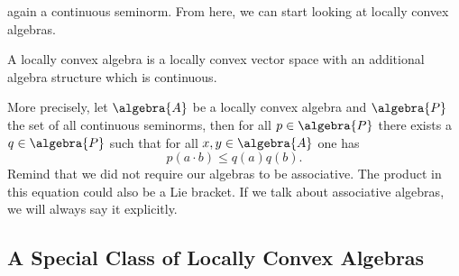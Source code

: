 again a continuous seminorm. From here, we can start looking at locally convex 
algebras.
\begin{definition}
	\label{Def:LCAlgebra}
	A locally convex algebra is a locally convex vector space with an 
	additional algebra structure which is continuous.
\end{definition}
More precisely, let $\algebra{A}$ be a locally convex algebra and 
$\algebra{P}$ the set of all continuous seminorms, then for all $p \in 
\algebra{P}$ there exists a $q \in \algebra{P}$ such that for all $x, y \in 
\algebra{A}$ one has
\begin{equation}
	\label{LCAna:ProductContinuity}
	p(a \cdot b)
	\leq
	q(a) q(b).
\end{equation}
Remind that we did not require our algebras to be associative. The product in 
this equation could also be a Lie bracket. If we talk about associative 
algebras, we will always say it explicitly.



\subsection{A Special Class of Locally Convex Algebras}

